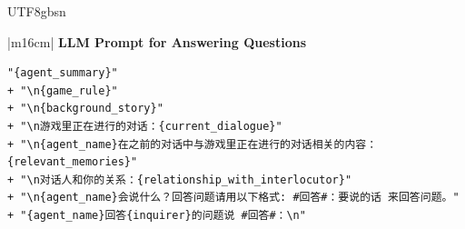\documentclass[11pt]{article}
\begin{document}
{  


\clearpage
\newpage



\begin{CJK}{UTF8}{gbsn}
\begin{table}[ht!]
\centering
\begin{tabular}{|m{16cm}|}
\hline
{}  {\textbf{LLM Prompt for Answering Questions}} \\
\hline
\begin{minipage}[t]{\linewidth}
\small\begin{verbatim}
"{agent_summary}"
+ "\n{game_rule}"
+ "\n{background_story}"
+ "\n游戏里正在进行的对话：{current_dialogue}"
+ "\n{agent_name}在之前的对话中与游戏里正在进行的对话相关的内容：{relevant_memories}"
+ "\n对话人和你的关系：{relationship_with_interlocutor}"
+ "\n{agent_name}会说什么？回答问题请用以下格式: #回答#：要说的话 来回答问题。"
+ "{agent_name}回答{inquirer}的问题说 #回答#：\n"


\end{verbatim}
\end{minipage}
\end{tabular}
\end{table}
\end{CJK}}
\end{document}
